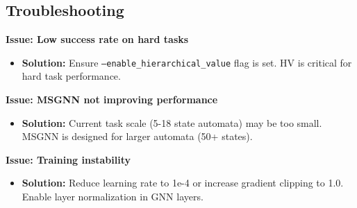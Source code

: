 \documentclass[conference]{IEEEtran}
\begin{document}
\subsection{Troubleshooting}

\textbf{Issue: Low success rate on hard tasks}
\begin{itemize}
    \item \textbf{Solution:} Ensure \texttt{--enable\_hierarchical\_value} flag is set. HV is critical for hard task performance.
\end{itemize}

\textbf{Issue: MSGNN not improving performance}
\begin{itemize}
    \item \textbf{Solution:} Current task scale (5-18 state automata) may be too small. MSGNN is designed for larger automata (50+ states).
\end{itemize}

\textbf{Issue: Training instability}
\begin{itemize}
    \item \textbf{Solution:} Reduce learning rate to 1e-4 or increase gradient clipping to 1.0. Enable layer normalization in GNN layers.
\end{itemize}
\end{document}
